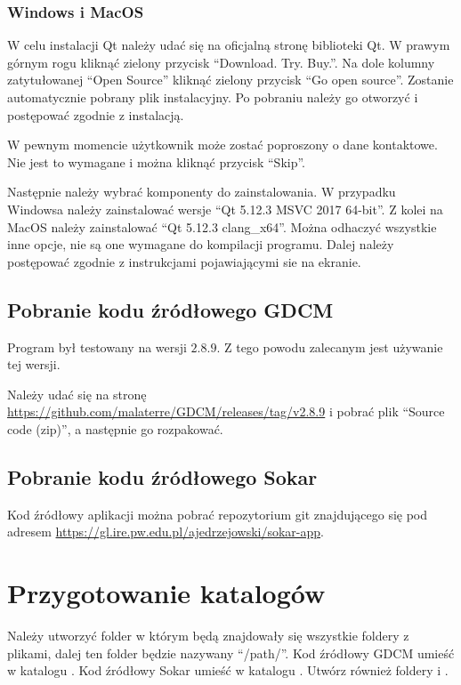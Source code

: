 \subsubsection*{Windows i MacOS}

\par
W celu instalacji Qt należy udać się na oficjalną stronę biblioteki Qt.
W prawym górnym rogu kliknąć zielony przycisk \enquote{Download. Try. Buy.}.
Na dole kolumny zatytułowanej \enquote{Open Source} kliknąć zielony przycisk \enquote{Go open source}.
Zostanie automatycznie pobrany plik instalacyjny.
Po pobraniu należy go otworzyć i postępować zgodnie z instalacją.
\par
W pewnym momencie użytkownik może zostać poproszony o dane kontaktowe.
Nie jest to wymagane i można kliknąć przycisk \enquote{Skip}.
\par
Następnie należy wybrać komponenty do zainstalowania.
W przypadku Windowsa należy zainstalować wersje \enquote{Qt 5.12.3 MSVC 2017 64-bit}.
Z kolei na MacOS należy zainstalować \enquote{Qt 5.12.3 clang\_x64}.
Można odhaczyć wszystkie inne opcje, nie są one wymagane do kompilacji programu.
Dalej należy postępować zgodnie z instrukcjami pojawiającymi sie na ekranie.

\subsection{Pobranie kodu źródłowego GDCM}

Program był testowany na wersji $2.8.9$.
Z tego powodu zalecanym jest używanie tej wersji.
\par
Należy udać się na stronę \url{https://github.com/malaterre/GDCM/releases/tag/v2.8.9} i pobrać plik \enquote{Source code (zip)}, a następnie go rozpakować.

\subsection{Pobranie kodu źródłowego Sokar}

Kod źródłowy aplikacji można pobrać repozytorium git znajdującego się pod adresem \url{https://gl.ire.pw.edu.pl/ajedrzejowski/sokar-app}.

\section{Przygotowanie katalogów}

Należy utworzyć folder w którym będą znajdowały się wszystkie foldery z plikami, dalej ten folder będzie nazywany \enquote{/path/}.
Kod źródłowy GDCM umieść w katalogu .
Kod źródłowy Sokar umieść w katalogu .
Utwórz również foldery  i .


